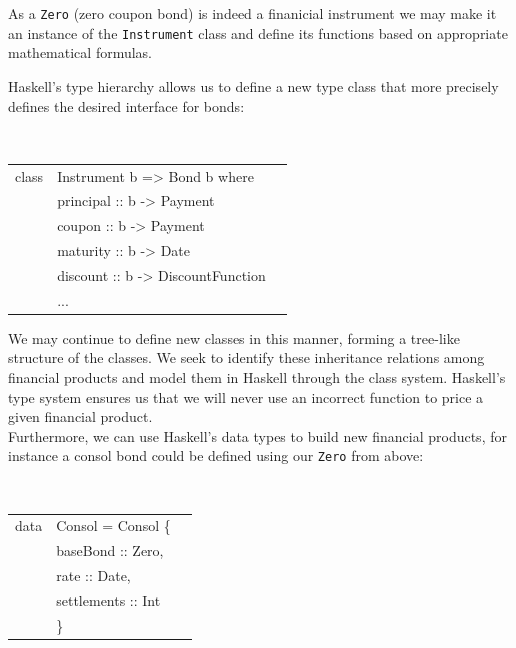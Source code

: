 \documentclass[11pt]{article}
\begin{document}
As a {\tt Zero} (zero coupon bond) is indeed a finanicial instrument we may make it an instance of
the {\tt Instrument} class and define its functions based on appropriate mathematical
formulas.

Haskell's type hierarchy allows us to define a new type class that more precisely
defines the desired interface for bonds:

\begin{center}
\tt
\begin{tabular}{lll}
class & Instrument b => Bond b where\\
      &\hspace{-1cm} principal :: b -> Payment\\
      &\hspace{-1cm} coupon    :: b -> Payment\\
      &\hspace{-1cm} maturity  :: b -> Date\\
      &\hspace{-1cm} discount  :: b -> DiscountFunction\\
      &\hspace{-1cm} ...\\
\end{tabular}
\end{center}

We may continue to define new classes in this manner, forming a tree-like
structure of the classes. We seek to identify these inheritance relations among
financial products and model them in Haskell through the class system.
Haskell's type system ensures us that we will never use an incorrect
function to price a given financial product.\\

Furthermore, we can use Haskell's data types to build new financial products, for instance
a consol bond could be defined using our {\tt Zero} from above:

\begin{center}
\tt
\begin{tabular}{lll}
data & Consol = Consol \{\\
      &\hspace{-1cm} baseBond    :: Zero,\\
      &\hspace{-1cm} rate        :: Date,\\
      &\hspace{-1cm} settlements :: Int\\
      &\hspace{-0.8cm}\}
\end{tabular}
\end{center}
\end{document}
